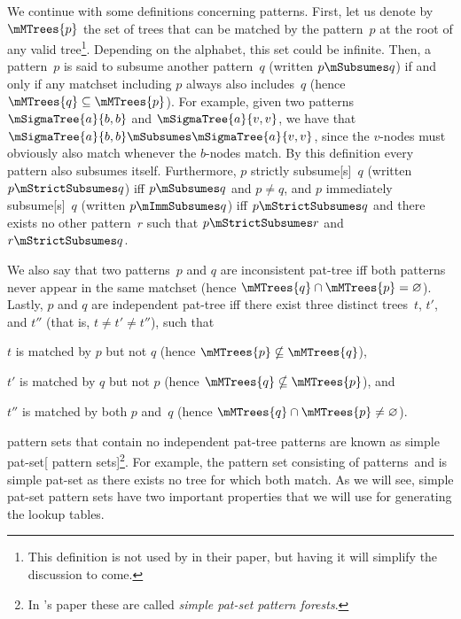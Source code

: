 {We continue with some definitions concerning \glspl{pattern}.
%
First, let us
denote by $\mMTrees{p}$ the set of trees that can be matched by the
\gls{pattern}~$p$ at the \gls{root} of any valid tree\footnote{This definition
  is not used by \citeauthor{Hoffmann1982} in their paper, but having it will
  simplify the discussion to come.}.
%
Depending on the \gls{alphabet}, this set
could be infinite.
%
Then, a \gls{pattern}~$p$ is said to \gls{subsume} another
\gls{pattern}~$q$ (written \mbox{$p \mSubsumes q$}) if and only if any
\gls{matchset} including $p$ always also includes~$q$ (hence \mbox{$\mMTrees{q}
  \subseteq \mMTrees{p}$}).
%
For example, given two
\glspl{pattern}~\mbox{$\mSigmaTree{a}{b, b}$} and \mbox{$\mSigmaTree{a}{v, v}$},
we have that \mbox{$\mSigmaTree{a}{b, b} \mSubsumes \mSigmaTree{a}{v, v}$},
since the \mbox{$v$-nodes} must obviously also match whenever the
\mbox{$b$-nodes} match.
%
By this definition every \gls{pattern} also
\gls{subsume}s itself.
%
 Furthermore, $p$ \gls{strictly subsume}[s]~$q$ (written
\mbox{$p \mStrictSubsumes q$}) iff \mbox{$p \mSubsumes q$} and \mbox{$p \not =
  q$}, and $p$ \gls{immediately subsume}[s]~$q$ (written \mbox{$p \mImmSubsumes
  q$}) iff \mbox{$p \mStrictSubsumes q$} and there exists no other
\gls{pattern}~$r$ such that \mbox{$p \mStrictSubsumes r$} and \mbox{$r
  \mStrictSubsumes q$}.

We also say that two \glspl{pattern}~$p$ and $q$ are \gls{inconsistent pat-tree}
iff both \glspl{pattern} never appear in the same \gls{matchset} (hence
\mbox{$\mMTrees{q} \cap \mMTrees{p} = \emptyset$}).
%
Lastly, $p$ and $q$ are
\gls{independent pat-tree} iff there exist three distinct \glspl{tree}~$t$,
$t'$, and $t''$ (that is, \mbox{$t \not = t' \not = t''$}), such that
\begin{inlinelist}
  \item $t$ is matched by $p$ but not $q$ (hence \mbox{$\mMTrees{p} \nsubseteq
    \mMTrees{q}$}),
  \item $t'$ is matched by $q$ but not $p$ (hence \mbox{$\mMTrees{q} \nsubseteq
    \mMTrees{p}$}), and
  \item $t''$ is matched by both $p$ and~$q$ (hence \mbox{$\mMTrees{q} \cap
    \mMTrees{p} \not = \emptyset$}).
\end{inlinelist}

\Glspl{pattern set} that contain no \gls{independent pat-tree} \glspl{pattern}
are known as \gls{simple pat-set}[ \glspl{pattern set}]\footnote{In
  \citeauthor{Hoffmann1982}'s paper these are called \emph{\gls{simple pat-set}
    \gls{pattern} \glspl{forest}}.}.
%
For example, the \gls{pattern set}
consisting of \glspl{pattern}~\tpatI and \tpatII is \gls{simple pat-set} as
there exists no \gls{tree} for which both match.
%
As we will see, \gls{simple
  pat-set} \glspl{pattern set} have two important properties that we will use
for generating the lookup tables.

}
